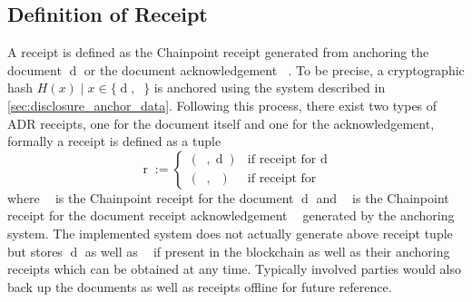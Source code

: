 \documentclass[12pt,msc,a4paper,oneside]{ucl_thesis}
\DeclareMathOperator{\receipt}{r}
\DeclareMathOperator{\doc}{d}
\DeclareMathOperator{\docack}{d^*}
\DeclareMathOperator{\docreceipt}{\receipt_{\doc}}
\DeclareMathOperator{\docackreceipt}{\receipt_{\docack}}
\begin{document}
\subsection{Definition of Receipt} \label{sec:definition_of_receipt}
A receipt is defined as the Chainpoint receipt generated from anchoring the document $\doc$ or the document acknowledgement $\docack$. To be precise, a cryptographic hash $H(x) \mid x \in \{\doc, \docack\}$ is anchored using the system described in \ref{sec:disclosure_anchor_data}. 
Following this process, there exist two types of ADR receipts, one for the document itself and one for the acknowledgement, formally a receipt is defined as a tuple
\begin{equation}
    \receipt := \begin{cases}
        (\docreceipt, \doc) & \textrm{if receipt for } \doc \\
        (\docackreceipt, \docack) & \textrm{if receipt for }  \docack
    \end{cases}
    \label{eq:disclosure_receipt}
\end{equation}
where $\docreceipt$ is the Chainpoint receipt for the document $\doc$ and $\docackreceipt$ is the Chainpoint receipt for the document receipt acknowledgement $\docack$ generated by the anchoring system. The implemented system does not actually generate above receipt tuple but stores $\doc$ as well as $\docack$ if present in the blockchain as well as their anchoring receipts which can be obtained at any time. Typically involved parties would also back up the documents as well as receipts offline for future reference.
\end{document}
